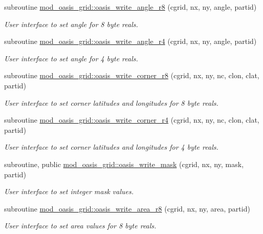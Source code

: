 \begin{DoxyCompactItemize}
subroutine \hyperlink{namespacemod__oasis__grid_a5ffeb1d150d305f2868114faf7ebddb2}{mod\+\_\+oasis\+\_\+grid\+::oasis\+\_\+write\+\_\+angle\+\_\+r8} (cgrid, nx, ny, angle, partid)
\begin{DoxyCompactList}\small\item\em User interface to set angle for 8 byte reals. \end{DoxyCompactList}\item 
subroutine \hyperlink{namespacemod__oasis__grid_aa4f44626552980d5418d77447e1ce058}{mod\+\_\+oasis\+\_\+grid\+::oasis\+\_\+write\+\_\+angle\+\_\+r4} (cgrid, nx, ny, angle, partid)
\begin{DoxyCompactList}\small\item\em User interface to set angle for 4 byte reals. \end{DoxyCompactList}\item 
subroutine \hyperlink{namespacemod__oasis__grid_af6953999aa6fb1d0190187052bf52671}{mod\+\_\+oasis\+\_\+grid\+::oasis\+\_\+write\+\_\+corner\+\_\+r8} (cgrid, nx, ny, nc, clon, clat, partid)
\begin{DoxyCompactList}\small\item\em User interface to set corner latitudes and longitudes for 8 byte reals. \end{DoxyCompactList}\item 
subroutine \hyperlink{namespacemod__oasis__grid_a30e5d9c4766b2f323d4b930499e0f23b}{mod\+\_\+oasis\+\_\+grid\+::oasis\+\_\+write\+\_\+corner\+\_\+r4} (cgrid, nx, ny, nc, clon, clat, partid)
\begin{DoxyCompactList}\small\item\em User interface to set corner latitudes and longitudes for 4 byte reals. \end{DoxyCompactList}\item 
subroutine, public \hyperlink{namespacemod__oasis__grid_a16906db2b252a3a5ce85e21aa1336e3b}{mod\+\_\+oasis\+\_\+grid\+::oasis\+\_\+write\+\_\+mask} (cgrid, nx, ny, mask, partid)
\begin{DoxyCompactList}\small\item\em User interface to set integer mask values. \end{DoxyCompactList}\item 
subroutine \hyperlink{namespacemod__oasis__grid_ae54eaec7b4e9d4877af0ce8537b0b256}{mod\+\_\+oasis\+\_\+grid\+::oasis\+\_\+write\+\_\+area\+\_\+r8} (cgrid, nx, ny, area, partid)
\begin{DoxyCompactList}\small\item\em User interface to set area values for 8 byte reals. \end{DoxyCompactList}\item 

\end{DoxyCompactItemize}
